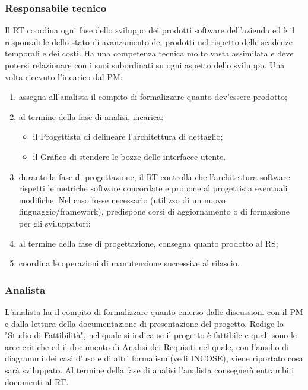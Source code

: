 \subsubsection{Responsabile tecnico}
Il RT coordina ogni fase dello sviluppo dei prodotti software dell\textquoteright{}azienda ed \`{e} il responsabile
dello stato di avanzamento dei prodotti nel rispetto delle scadenze temporali e
dei costi. Ha una competenza tecnica molto vasta assimilata e deve potersi
relazionare con i suoi subordinati su ogni aspetto dello sviluppo. Una volta ricevuto
l\textquoteright{}incarico dal PM:
\begin{enumerate}
\item assegna all\textquoteright{}analista il compito di formalizzare quanto dev\textquoteright{}essere prodotto;
\item al termine della fase di analisi, incarica:
\begin{itemize}
\item il Progettista di delineare l\textquoteright{}architettura di dettaglio;
\item il Grafico di stendere le bozze delle interfacce utente.
\end{itemize}
\item durante la fase di progettazione, il RT controlla che l\textquoteright{}architettura software rispetti
le metriche software concordate e propone al progettista eventuali modifiche. Nel
caso fosse necessario (utilizzo di un nuovo linguaggio/framework), predispone corsi
di aggiornamento o di formazione per gli sviluppatori;
\item al termine della fase di progettazione, consegna quanto prodotto al RS;
\item coordina le operazioni di manutenzione successive al rilascio.
\end{enumerate}

\subsubsection{Analista}
L\textquoteright{}analista ha il compito di formalizzare quanto emerso dalle discussioni con il PM e
dalla lettura della documentazione di presentazione del progetto. Redige lo "Studio di Fattibilit\`{a}", nel quale si indica se il progetto \`{e} fattibile e quali sono le aree critiche ed il documento di Analisi dei Requisiti nel quale, con l\textquoteright{}ausilio di diagrammi dei casi d\textquoteright{}uso e di altri formalismi(vedi INCOSE), viene riportato cosa sar\`{a} sviluppato. Al termine della fase di analisi l\textquoteright{}analista consegner\`{a} entrambi i documenti al RT.

